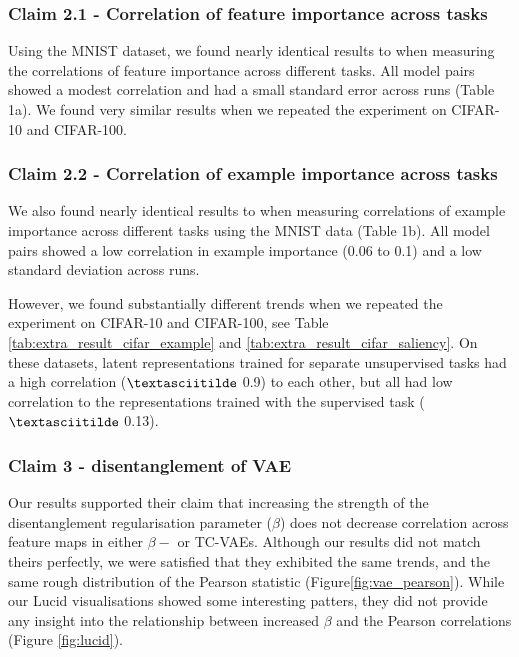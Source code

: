 

\subsubsection{Claim 2.1 - Correlation of feature importance across tasks}

Using the MNIST dataset, we found nearly identical results to \citet{crabbe2022label} when measuring the correlations of feature importance across different tasks. All model pairs showed a modest correlation  and had a small standard error across runs (Table 1a). We found very similar results when we repeated the experiment on CIFAR-10 and CIFAR-100.



\subsubsection{Claim 2.2 - Correlation of example importance across tasks}

We also found nearly identical results to \citet{crabbe2022label} when measuring correlations of example importance across different tasks using the MNIST data (Table 1b). All model pairs showed a low correlation in example importance (0.06 to 0.1) and a low standard deviation across runs. 

\vspace{1em}

However, we found substantially different trends when we repeated the experiment on CIFAR-10 and CIFAR-100, see Table \ref{tab:extra_result_cifar_example} and \ref{tab:extra_result_cifar_saliency}. On these datasets, latent representations trained for separate unsupervised tasks had a high correlation ($\textasciitilde$ 0.9) to each other, but all had low correlation to the representations trained with the supervised task ($\textasciitilde$ 0.13).

% 

\subsubsection{Claim 3 - disentanglement of VAE}

Our results supported their claim that increasing the strength of the disentanglement regularisation parameter ($\beta$) does not decrease correlation across feature maps in either $\beta-$ or TC-VAEs. Although our results did not match theirs perfectly, we were satisfied that they exhibited the same trends, and the same rough distribution of the Pearson statistic (Figure\ref{fig:vae_pearson}). While our Lucid visualisations showed some interesting patters, they did not provide any insight into the relationship between increased $\beta$ and the Pearson correlations (Figure \ref{fig:lucid}).

